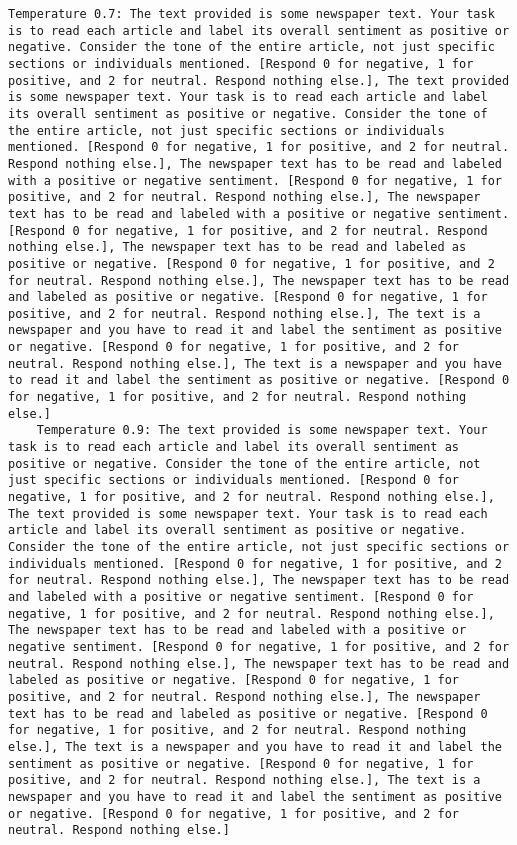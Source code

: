 \begin{lstlisting}[label=lst:poor_performing_prompts]
	Temperature 0.7: The text provided is some newspaper text. Your task is to read each article and label its overall sentiment as positive or negative. Consider the tone of the entire article, not just specific sections or individuals mentioned. [Respond 0 for negative, 1 for positive, and 2 for neutral. Respond nothing else.], The text provided is some newspaper text. Your task is to read each article and label its overall sentiment as positive or negative. Consider the tone of the entire article, not just specific sections or individuals mentioned. [Respond 0 for negative, 1 for positive, and 2 for neutral. Respond nothing else.], The newspaper text has to be read and labeled with a positive or negative sentiment. [Respond 0 for negative, 1 for positive, and 2 for neutral. Respond nothing else.], The newspaper text has to be read and labeled with a positive or negative sentiment. [Respond 0 for negative, 1 for positive, and 2 for neutral. Respond nothing else.], The newspaper text has to be read and labeled as positive or negative. [Respond 0 for negative, 1 for positive, and 2 for neutral. Respond nothing else.], The newspaper text has to be read and labeled as positive or negative. [Respond 0 for negative, 1 for positive, and 2 for neutral. Respond nothing else.], The text is a newspaper and you have to read it and label the sentiment as positive or negative. [Respond 0 for negative, 1 for positive, and 2 for neutral. Respond nothing else.], The text is a newspaper and you have to read it and label the sentiment as positive or negative. [Respond 0 for negative, 1 for positive, and 2 for neutral. Respond nothing else.]
	Temperature 0.9: The text provided is some newspaper text. Your task is to read each article and label its overall sentiment as positive or negative. Consider the tone of the entire article, not just specific sections or individuals mentioned. [Respond 0 for negative, 1 for positive, and 2 for neutral. Respond nothing else.], The text provided is some newspaper text. Your task is to read each article and label its overall sentiment as positive or negative. Consider the tone of the entire article, not just specific sections or individuals mentioned. [Respond 0 for negative, 1 for positive, and 2 for neutral. Respond nothing else.], The newspaper text has to be read and labeled with a positive or negative sentiment. [Respond 0 for negative, 1 for positive, and 2 for neutral. Respond nothing else.], The newspaper text has to be read and labeled with a positive or negative sentiment. [Respond 0 for negative, 1 for positive, and 2 for neutral. Respond nothing else.], The newspaper text has to be read and labeled as positive or negative. [Respond 0 for negative, 1 for positive, and 2 for neutral. Respond nothing else.], The newspaper text has to be read and labeled as positive or negative. [Respond 0 for negative, 1 for positive, and 2 for neutral. Respond nothing else.], The text is a newspaper and you have to read it and label the sentiment as positive or negative. [Respond 0 for negative, 1 for positive, and 2 for neutral. Respond nothing else.], The text is a newspaper and you have to read it and label the sentiment as positive or negative. [Respond 0 for negative, 1 for positive, and 2 for neutral. Respond nothing else.]

\end{lstlisting}
